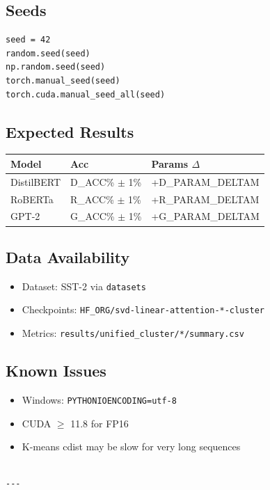 \subsection{Seeds}

\begin{lstlisting}
seed = 42
random.seed(seed)
np.random.seed(seed)
torch.manual_seed(seed)
torch.cuda.manual_seed_all(seed)
\end{lstlisting}

\subsection{Expected Results}

\begin{table}[H]
\centering
\small
\begin{tabular}{lll}
\toprule
\textbf{Model} & \textbf{Acc} & \textbf{Params $\Delta$} \\
\midrule
DistilBERT & {{D\_ACC}}\% $\pm$ 1\% & +{{D\_PARAM\_DELTA}}M \\
RoBERTa & {{R\_ACC}}\% $\pm$ 1\% & +{{R\_PARAM\_DELTA}}M \\
GPT-2 & {{G\_ACC}}\% $\pm$ 1\% & +{{G\_PARAM\_DELTA}}M \\
\bottomrule
\end{tabular}
\end{table}

\subsection{Data Availability}

\begin{itemize}
\item Dataset: SST-2 via \texttt{datasets}
\item Checkpoints: \texttt{{{HF\_ORG}}/svd-linear-attention-*-cluster}
\item Metrics: \texttt{results/unified\_cluster/*/summary.csv}

\end{itemize}
\subsection{Known Issues}

\begin{itemize}
\item Windows: \texttt{PYTHONIOENCODING=utf-8}
\item CUDA $\ge$ 11.8 for FP16
\item K-means cdist may be slow for very long sequences
\end{itemize}
\begin{lstlisting}

---
\end{lstlisting}